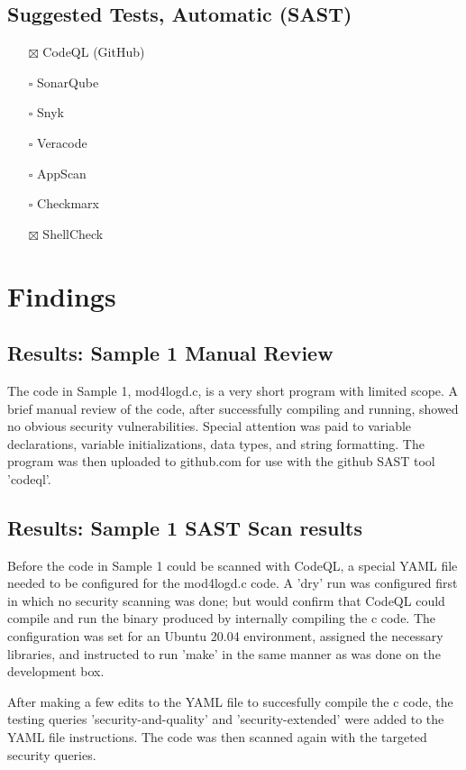 \documentclass[11pt]{article}
\begin{document}
\subsection{Suggested Tests, Automatic (SAST)}
\label{sec:org386e515}
\begin{itemize}
\item[{$\boxtimes$}] CodeQL (GitHub)
\item[{$\square$}] SonarQube
\item[{$\square$}] Snyk
\item[{$\square$}] Veracode
\item[{$\square$}] AppScan
\item[{$\square$}] Checkmarx
\item[{$\boxtimes$}] ShellCheck
\end{itemize}
\section{Findings}
\label{sec:org5831ecf}
\subsection{Results: Sample 1 Manual Review}
\label{sec:orgfad0810}
The code in Sample 1, mod4logd.c, is a very short program with limited scope. A
brief manual review of the code, after successfully compiling and running,
showed no obvious security vulnerabilities.  Special attention was paid to
variable declarations, variable initializations, data types, and string
formatting.  The program was then uploaded to github.com for use with the github
SAST tool 'codeql'.
\subsection{Results: Sample 1 SAST Scan results}
\label{sec:org6a07277}
Before the code in Sample 1 could be scanned with CodeQL, a special YAML file
needed to be configured for the mod4logd.c code.  A 'dry' run was configured
first in which no security scanning was done; but would confirm that CodeQL
could compile and run the binary produced by internally compiling the c code.
The configuration was set for an Ubuntu 20.04 environment, assigned the
necessary libraries, and instructed to run 'make' in the same manner as was done
on the development box.

After making a few edits to the YAML file to succesfully compile the c code, the
testing queries 'security-and-quality' and 'security-extended' were added to the
YAML file instructions.  The code was then scanned again with the targeted
security queries.
\end{document}
